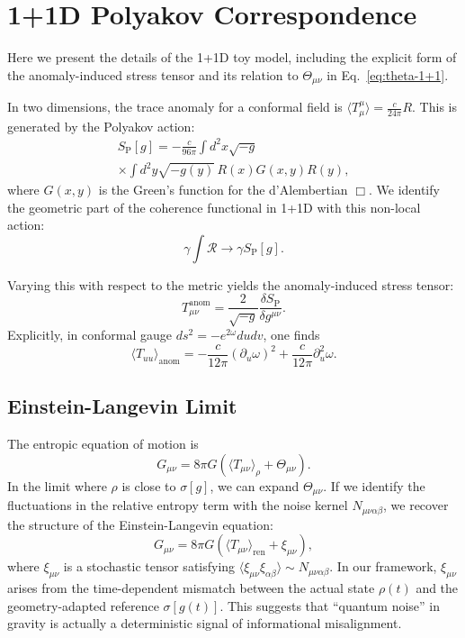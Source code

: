 \documentclass[aps,prd,twocolumn,superscriptaddress,nofootinbib,floatfix]{revtex4-2}
\newcommand{\Rdens}{\mathcal{R}}
\newcommand{\Tmn}{\Theta_{\mu\nu}}
\begin{document}
\section{1+1D Polyakov Correspondence}
\label{appendix:polyakov}

Here we present the details of the 1+1D toy model, including the explicit form of the anomaly-induced stress tensor and its relation to $\Tmn$ in Eq.~\eqref{eq:theta-1+1}.

In two dimensions, the trace anomaly for a conformal field is $\langle T^\mu_\mu \rangle = \frac{c}{24\pi} R$. This is generated by the Polyakov action:
\begin{multline}
    S_{\mathrm{P}}[g] = - \frac{c}{96\pi} \int d^2x \sqrt{-g} \\
    \times \int d^2y \sqrt{-g(y)}\, R(x) G(x,y) R(y),
\end{multline}
where $G(x,y)$ is the Green's function for the d'Alembertian $\Box$.
We identify the geometric part of the coherence functional in 1+1D with this non-local action:
\begin{equation}
    \gamma \int \Rdens \rightarrow \gamma S_{\mathrm{P}}[g].
\end{equation}

Varying this with respect to the metric yields the anomaly-induced stress tensor:
\begin{equation}
    T_{\mu\nu}^{\mathrm{anom}} = \frac{2}{\sqrt{-g}} \frac{\delta S_{\mathrm{P}}}{\delta g^{\mu\nu}}.
\end{equation}
Explicitly, in conformal gauge $ds^2 = -e^{2\omega} du dv$, one finds
\begin{equation}
    \langle T_{uu} \rangle_{\mathrm{anom}} = - \frac{c}{12\pi} (\partial_u \omega)^2 + \frac{c}{12\pi} \partial_u^2 \omega.
\end{equation}

\subsection{Einstein-Langevin Limit}
The entropic equation of motion is
\begin{equation}
    G_{\mu\nu} = 8\pi G (\langle T_{\mu\nu} \rangle_{\rho} + \Tmn).
\end{equation}
In the limit where $\rho$ is close to $\sigma[g]$, we can expand $\Tmn$. If we identify the fluctuations in the relative entropy term with the noise kernel $N_{\mu\nu\alpha\beta}$, we recover the structure of the Einstein-Langevin equation:
\begin{equation}
    G_{\mu\nu} = 8\pi G (\langle T_{\mu\nu} \rangle_{\mathrm{ren}} + \xi_{\mu\nu}),
\end{equation}
where $\xi_{\mu\nu}$ is a stochastic tensor satisfying $\langle \xi_{\mu\nu} \xi_{\alpha\beta} \rangle \sim N_{\mu\nu\alpha\beta}$.
In our framework, $\xi_{\mu\nu}$ arises from the time-dependent mismatch between the actual state $\rho(t)$ and the geometry-adapted reference $\sigma[g(t)]$.
This suggests that ``quantum noise'' in gravity is actually a deterministic signal of informational misalignment.
\end{document}
